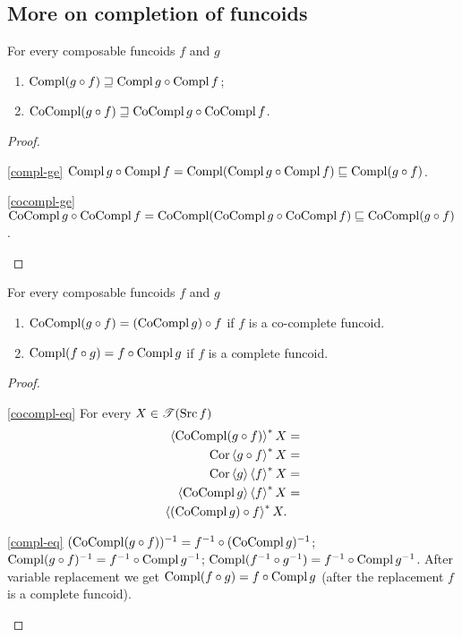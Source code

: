 \subsection{More on completion of funcoids}
\begin{prop}
For every composable funcoids $f$ and $g$
\begin{enumerate}
\item \label{compl-ge}$\operatorname{Compl}(g\circ f)\sqsupseteq\operatorname{Compl} g\circ\operatorname{Compl} f$;
\item \label{cocompl-ge}$\operatorname{CoCompl}(g\circ f)\sqsupseteq\operatorname{CoCompl} g\circ\operatorname{CoCompl}
f$.
\end{enumerate}
\end{prop}
\begin{proof}
~
\begin{disorder}
\item [{\ref{compl-ge}}] $\operatorname{Compl} g\circ\operatorname{Compl} f=\operatorname{Compl}(\operatorname{Compl} g\circ\operatorname{Compl}
f)\sqsubseteq\operatorname{Compl}(g\circ f)$.
\item [{\ref{cocompl-ge}}] $\operatorname{CoCompl} g\circ\operatorname{CoCompl} f=\operatorname{CoCompl}(\operatorname{CoCompl}
g\circ\operatorname{CoCompl} f)\sqsubseteq\operatorname{CoCompl}(g\circ f)$.
\end{disorder}
\end{proof}
\begin{prop}\label{comp-compl}
For every composable funcoids $f$ and $g$
\begin{enumerate}
\item \label{cocompl-eq}$\operatorname{CoCompl}(g\circ f)=(\operatorname{CoCompl} g)\circ f$ if $f$
is a co-complete funcoid.
\item \label{compl-eq}$\operatorname{Compl}(f\circ g)=f\circ\operatorname{Compl} g$ if $f$ is a complete
funcoid.
\end{enumerate}
\end{prop}
\begin{proof}
~
\begin{widedisorder}
\item [{\ref{cocompl-eq}}] For every $X\in\mathscr{T}(\operatorname{Src} f)$
\begin{align*}
\left\langle \operatorname{CoCompl}(g\circ f)\right\rangle ^{\ast}X & =\\
\operatorname{Cor}\left\langle g\circ f\right\rangle ^{\ast}X & =\\
\operatorname{Cor}\left\langle g\right\rangle\left\langle f\right\rangle ^{\ast}X & =\\
\left\langle \operatorname{CoCompl} g\right\rangle\left\langle f\right\rangle ^{\ast}X & =\\
\left\langle (\operatorname{CoCompl} g)\circ f\right\rangle ^{\ast}X.
\end{align*}

\item [{\ref{compl-eq}}] $(\operatorname{CoCompl}(g\circ f))^{-1}=f^{-1}\circ(\operatorname{CoCompl}
g)^{-1}$;
$\operatorname{Compl}(g\circ f)^{-1}=f^{-1}\circ\operatorname{Compl} g^{-1}$; $\operatorname{Compl}(f^{-1}\circ
g^{-1})=f^{-1}\circ\operatorname{Compl} g^{-1}$.
After variable replacement we get $\operatorname{Compl}(f\circ g)=f\circ\operatorname{Compl} g$
(after the replacement $f$ is a complete funcoid).
\end{widedisorder}
\end{proof}
